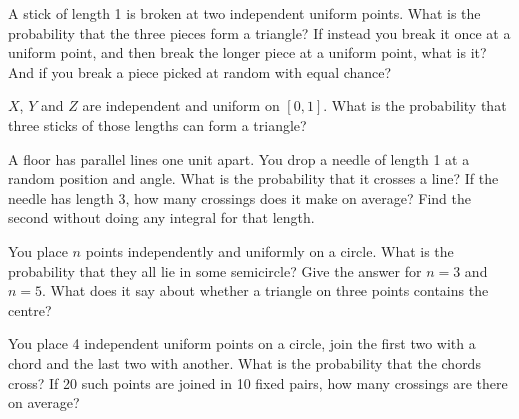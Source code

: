 \begin{question}\label{iq:iv1:continuous-and-geometric-probability:6}
A stick of length 1 is broken at two independent uniform points. What is the probability that the three pieces form a triangle? If instead you break it once at a uniform point, and then break the longer piece at a uniform point, what is it? And if you break a piece picked at random with equal chance?
\end{question}

\begin{question}\label{iq:iv1:continuous-and-geometric-probability:7}
$X$, $Y$ and $Z$ are independent and uniform on $[0, 1]$. What is the probability that three sticks of those lengths can form a triangle?
\end{question}

\begin{question}\label{iq:iv1:continuous-and-geometric-probability:8}
A floor has parallel lines one unit apart. You drop a needle of length 1 at a random position and angle. What is the probability that it crosses a line? If the needle has length 3, how many crossings does it make on average? Find the second without doing any integral for that length.
\end{question}

\begin{question}\label{iq:iv1:continuous-and-geometric-probability:9}
You place $n$ points independently and uniformly on a circle. What is the probability that they all lie in some semicircle? Give the answer for $n = 3$ and $n = 5$. What does it say about whether a triangle on three points contains the centre?
\end{question}

\begin{question}\label{iq:iv1:continuous-and-geometric-probability:10}
You place 4 independent uniform points on a circle, join the first two with a chord and the last two with another. What is the probability that the chords cross? If 20 such points are joined in 10 fixed pairs, how many crossings are there on average?
\end{question}

